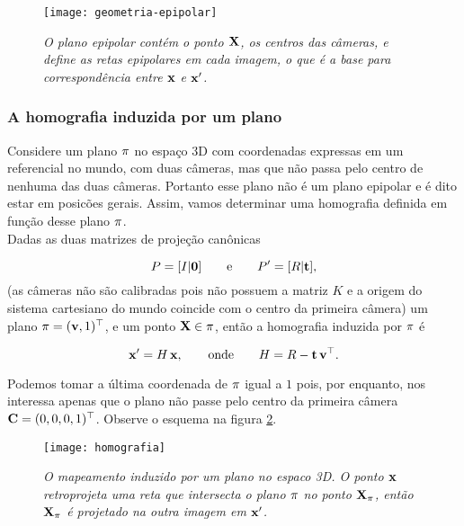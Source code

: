 \begin{figure}[!htb]
\centering
\texttt{[image: geometria-epipolar]}
\caption{\textit{O plano epipolar contém o ponto $\mathbf{X}$, os centros das câmeras, e define as retas epipolares em cada imagem, o que é a base para correspondência entre $\mathbf{x}$ e $\mathbf{x}'$.}}
\label{fig.geo-epipolar}
\end{figure}

\subsubsection{A homografia induzida por um plano}\label{sec.homografia}

Considere um plano $\pi$ no espaço 3D com coordenadas expressas em um referencial no mundo, com duas câmeras, mas que não passa pelo centro de nenhuma das duas câmeras. Portanto esse plano não é um plano epipolar e é dito estar em posicões gerais. Assim, vamos determinar uma homografia definida em função desse plano $\pi$.\\

Dadas as duas matrizes de projeção canônicas

\begin{equation*}
P=[I|{\bf 0}]\qquad\text{e}\qquad P'=[R|{\bf t}],
\end{equation*}
(as câmeras não são calibradas pois não possuem a matriz $K$ e a origem do sistema cartesiano do mundo coincide com o centro da primeira câmera) um plano $\pi=({\bf v},1)^\top$, e um ponto $\mathbf{X}\in\pi$, então a homografia induzida por $\pi$ é

\begin{equation*}
\mathbf{x}'=H\,\mathbf{x},\qquad\text{onde}\qquad H=R-{\bf t}\,{\bf v}^\top.
\end{equation*}

Podemos tomar a última coordenada de $\pi$ igual a $1$ pois, por enquanto, nos interessa apenas que o plano não passe pelo centro da primeira câmera ${\bf C}=(0,0,0,1)^\top$. Observe o esquema na figura \ref{fig.homografia}. 

\begin{figure}[!htb]
\centering
\texttt{[image: homografia]}
\caption{\textit{O mapeamento induzido por um plano no espaco 3D. O ponto $\mathbf{x}$ retroprojeta uma reta que intersecta o plano $\pi$ no ponto $\mathbf{X}_{\pi}$, então $\mathbf{X}_{\pi}$ é projetado na outra imagem em $\mathbf{x}'$.}}
\label{fig.homografia}
\end{figure}




